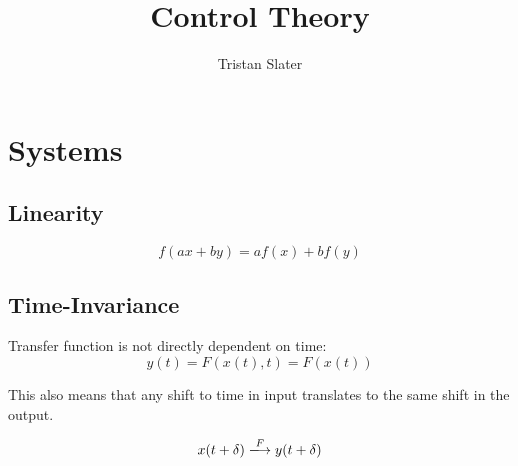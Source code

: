\documentclass{article}
\title{Control Theory}
\author{Tristan Slater}
\begin{document}
    \maketitle

    \section{Systems}

    \subsection{Linearity}

    \begin{equation}
        f(ax + by) = af(x) + bf(y)
    \end{equation}

    \subsection{Time-Invariance}

    Transfer function is not directly dependent on time: \begin{equation}
        y(t) = F(x(t), t) = F(x(t))
    \end{equation}

    This also means that any shift to time in input translates to the same shift in the output.

    \begin{equation}
        x(t + \delta) \xlongrightarrow{F} y(t + \delta)
    \end{equation}
\end{document}
